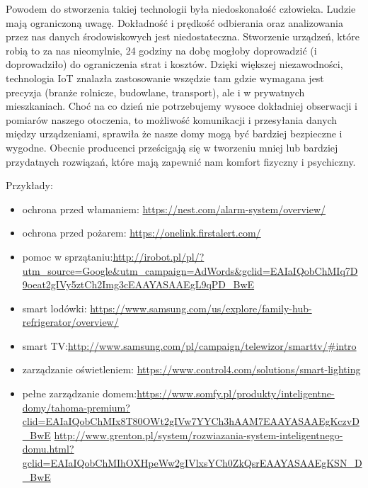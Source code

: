 \documentclass{xmgr}
\begin{document}
Powodem do stworzenia takiej technologii była niedoskonałość człowieka. Ludzie mają ograniczoną uwagę. Dokładność i prędkość odbierania oraz analizowania przez nas danych środowiskowych jest niedostateczna. Stworzenie urządzeń, które robią to za nas nieomylnie, 24 godziny na dobę mogłoby doprowadzić (i doprowadziło) do ograniczenia strat i kosztów. Dzięki większej niezawodności, technologia IoT znalazła zastosowanie wszędzie tam gdzie wymagana jest precyzja (branże rolnicze, budowlane, transport), ale i w prywatnych mieszkaniach.
Choć na co dzień nie potrzebujemy wysoce dokładniej obserwacji i pomiarów naszego otoczenia, to możliwość komunikacji i  przesyłania danych między urządzeniami, sprawiła że nasze domy mogą być bardziej bezpieczne i wygodne. Obecnie producenci prześcigają się w tworzeniu mniej lub bardziej przydatnych rozwiązań, które mają zapewnić nam komfort fizyczny i psychiczny.

\newpage Przykłady:
\begin{itemize}
\item ochrona przed włamaniem: \newline \url{https://nest.com/alarm-system/overview/}
\item ochrona przed pożarem: \newline \url{https://onelink.firstalert.com/}
\item pomoc w sprzątaniu:\newline \url{http://irobot.pl/pl/?utm_source=Google&utm_campaign=AdWords&gclid=EAIaIQobChMIq7D9oeat2gIVy5ztCh2Img3cEAAYASAAEgL9qPD_BwE}
\item smart lodówki: \newline \url{https://www.samsung.com/us/explore/family-hub-refrigerator/overview/}
\item smart TV:\newline \url{http://www.samsung.com/pl/campaign/telewizor/smarttv/#intro}
\item zarządzanie oświetleniem: \newline \url{https://www.control4.com/solutions/smart-lighting}
\item pełne zarządzanie domem:\newline \url{https://www.somfy.pl/produkty/inteligentne-domy/tahoma-premium?clid=EAIaIQobChMIx8T80OWt2gIVw7YYCh3hAAM7EAAYASAAEgKczvD_BwE}
\hspace{5mm} \newline \url{http://www.grenton.pl/system/rozwiazania-system-inteligentnego-domu.html?gclid=EAIaIQobChMIhOXHpeWw2gIVlxsYCh0ZkQsrEAAYASAAEgKSN_D_BwE}
\end{itemize}
\end{document}
